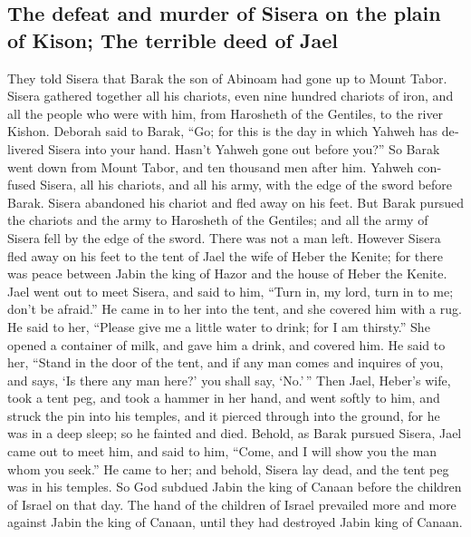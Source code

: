 \begin{paracol}{2}
\begin{otherlanguage}{english}
\hypertarget{the-defeat-and-murder-of-sisera-on-the-plain-of-kison-the-terrible-deed-of-jael}{%
\subsection{The defeat and murder of Sisera on the plain of Kison; The
terrible deed of
Jael}\label{the-defeat-and-murder-of-sisera-on-the-plain-of-kison-the-terrible-deed-of-jael}}

 They told Sisera that Barak the son of Abinoam had gone
up to Mount Tabor.  Sisera gathered together all his
chariots, even nine hundred chariots of iron, and all the people who
were with him, from Harosheth of the Gentiles, to the river Kishon.
 Deborah said to Barak, ``Go; for this is the day in
which Yahweh has delivered Sisera into your hand. Hasn't Yahweh gone out
before you?'' So Barak went down from Mount Tabor, and ten thousand men
after him.  Yahweh confused Sisera, all his chariots, and
all his army, with the edge of the sword before Barak. Sisera abandoned
his chariot and fled away on his feet.  But Barak pursued
the chariots and the army to Harosheth of the Gentiles; and all the army
of Sisera fell by the edge of the sword. There was not a man left.
 However Sisera fled away on his feet to the tent of Jael
the wife of Heber the Kenite; for there was peace between Jabin the king
of Hazor and the house of Heber the Kenite.  Jael went
out to meet Sisera, and said to him, ``Turn in, my lord, turn in to me;
don't be afraid.'' He came in to her into the tent, and she covered him
with a rug.  He said to her, ``Please give me a little
water to drink; for I am thirsty.'' She opened a container of milk, and
gave him a drink, and covered him.  He said to her,
``Stand in the door of the tent, and if any man comes and inquires of
you, and says, `Is there any man here?' you shall say, `No.'\,''
 Then Jael, Heber's wife, took a tent peg, and took a
hammer in her hand, and went softly to him, and struck the pin into his
temples, and it pierced through into the ground, for he was in a deep
sleep; so he fainted and died.  Behold, as Barak pursued
Sisera, Jael came out to meet him, and said to him, ``Come, and I will
show you the man whom you seek.'' He came to her; and behold, Sisera lay
dead, and the tent peg was in his temples.  So God
subdued Jabin the king of Canaan before the children of Israel on that
day.  The hand of the children of Israel prevailed more
and more against Jabin the king of Canaan, until they had destroyed
Jabin king of Canaan.


\end{otherlanguage}
\end{paracol}
